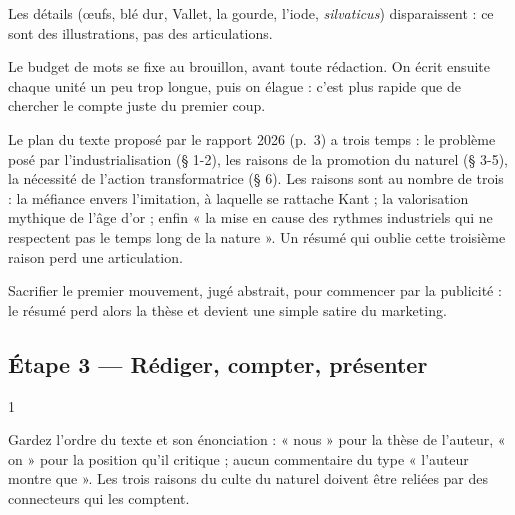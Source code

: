 \documentclass[11pt,a4paper]{article}
\begin{document}
Les détails (œufs, blé dur, Vallet, la gourde, l'iode, \emph{silvaticus}) disparaissent : ce sont des illustrations, pas des articulations.

\begin{methode}

Le budget de mots se fixe au brouillon, avant toute rédaction. On écrit ensuite chaque unité un peu trop longue, puis on élague : c'est plus rapide que de chercher le compte juste du premier coup.

\end{methode}

\begin{jury}

Le plan du texte proposé par le rapport 2026 (p.~3) a trois temps : le problème posé par l'industrialisation (§ 1-2), les raisons de la promotion du naturel (§ 3-5), la nécessité de l'action transformatrice (§ 6). Les raisons sont au nombre de trois : la méfiance envers l'imitation, à laquelle se rattache Kant ; la valorisation mythique de l'âge d'or ; enfin « la mise en cause des rythmes industriels qui ne respectent pas le temps long de la nature ». Un résumé qui oublie cette troisième raison perd une articulation.

\end{jury}

\begin{piege}

Sacrifier le premier mouvement, jugé abstrait, pour commencer par la publicité : le résumé perd alors la thèse et devient une simple satire du marketing.

\end{piege}

\hypertarget{uxe9tape-3-ruxe9diger-compter-pruxe9senter}{%
\subsection{Étape 3 --- Rédiger, compter, présenter}\label{uxe9tape-3-ruxe9diger-compter-pruxe9senter}}

\begin{indication}{1}

Gardez l'ordre du texte et son énonciation : « nous » pour la thèse de l'auteur, « on » pour la position qu'il critique ; aucun commentaire du type « l'auteur montre que ». Les trois raisons du culte du naturel doivent être reliées par des connecteurs qui les comptent.

\end{indication}
\end{document}
